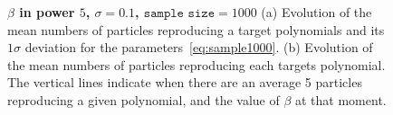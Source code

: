 \documentclass[11pt]{article}
\begin{document}
\begin{enumerate}
	  \begin{figure}[h!]
	  	\centering
	  	\caption{{\bfseries \boldmath $\beta$ in power $5$, $\sigma=0.1$, $\texttt{sample size} = 1000$} (a) Evolution of the mean numbers of particles reproducing a target polynomials and its $1\sigma$ deviation for the parameters~\eqref{eq:sample1000}. (b) Evolution of the mean numbers of particles reproducing each targets polynomial. The vertical lines indicate when there are an average 5 particles reproducing a given polynomial, and the value of $\beta$ at that moment.}
	  	\label{fig:sample1000}
	  \end{figure}
  \end{enumerate}
	
\end{document}
